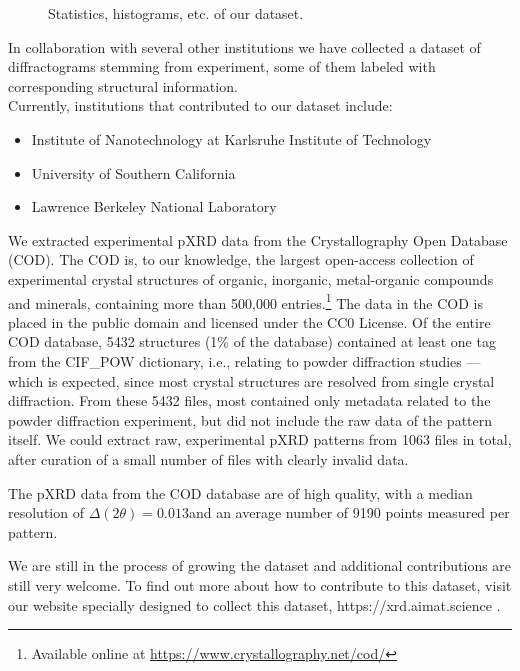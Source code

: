



\begin{figure*}[!ht]
    \centering
    \missingfigure{} 
    \caption{Statistics, histograms, etc. of our dataset.}
    \label{fig:statistics}
\end{figure*}

In collaboration with several other institutions we have collected a dataset of diffractograms stemming from experiment, some of them labeled with corresponding structural information. \\
Currently, institutions that contributed to our dataset include:
\begin{itemize}
    \item Institute of Nanotechnology at Karlsruhe Institute of Technology
    \item University of Southern California
    \item Lawrence Berkeley National Laboratory
\end{itemize}


We extracted experimental pXRD data from the Crystallography Open Database (COD).\cite{Grazulis2009, Vaitkus2023}  The COD is, to our knowledge, the largest open-access collection of experimental crystal structures of organic, inorganic, metal-organic compounds and minerals, containing more than 500,000 entries.\footnote{Available online at \url{https://www.crystallography.net/cod/}} The data in the COD is placed in the public domain and licensed under the CC0 License. Of the entire COD database, 5432 structures (1\% of the database) contained at least one tag from the {CIF\_POW} dictionary, i.e., relating to powder diffraction studies --- which is expected, since most crystal structures are resolved from single crystal diffraction. From these 5432 files, most contained only metadata related to the powder diffraction experiment, but did not include the raw data of the pattern itself. We could extract raw, experimental pXRD patterns from 1063 files in total, after curation of a small number of files with clearly invalid data.

The pXRD data from the COD database are of high quality, with a median resolution of $\Delta(2\theta) = 0.013$\textdegree and an average number of 9190 points measured per pattern.



We are still in the process of growing the dataset and additional contributions are still very welcome. To find out more about how to contribute to this dataset, visit our website specially designed to collect this dataset, https://xrd.aimat.science .